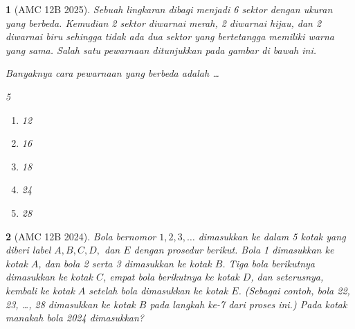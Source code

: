\documentclass[11pt,a4paper,DIV=12]{scrartcl}
\theoremstyle{justnumber}
\newtheorem{problem}{}
\begin{document}
\begin{problem}[AMC 12B 2025]
  Sebuah lingkaran dibagi menjadi 6 sektor dengan ukuran yang berbeda. Kemudian 2 sektor diwarnai merah, 2 diwarnai hijau, dan 2 diwarnai biru sehingga tidak ada dua sektor yang bertetangga memiliki warna yang sama. Salah satu pewarnaan ditunjukkan pada gambar di bawah ini.
  \begin{center}
  \end{center}
  Banyaknya cara pewarnaan yang berbeda adalah \ldots

  \begin{multicols}{5}
    \begin{enumerate}
      \item[(A)] 12
      \item[(B)] 16
      \item[(C)] 18
      \item[(D)] 24
      \item[(E)] 28
    \end{enumerate}
  \end{multicols}
\end{problem}

\begin{problem}[AMC 12B 2024]
  Bola bernomor $1, 2, 3, \ldots$ dimasukkan ke dalam 5 kotak yang diberi label $A, B, C, D,$ dan $E$ dengan prosedur berikut. Bola 1 dimasukkan ke kotak $A$, dan bola 2 serta 3 dimasukkan ke kotak $B$. Tiga bola berikutnya dimasukkan ke kotak $C$, empat bola berikutnya ke kotak $D$, dan seterusnya, kembali ke kotak $A$ setelah bola dimasukkan ke kotak $E$. (Sebagai contoh, bola 22, 23, \ldots, 28 dimasukkan ke kotak $B$ pada langkah ke-7 dari proses ini.) Pada kotak manakah bola 2024 dimasukkan?
\end{problem}
\end{document}
